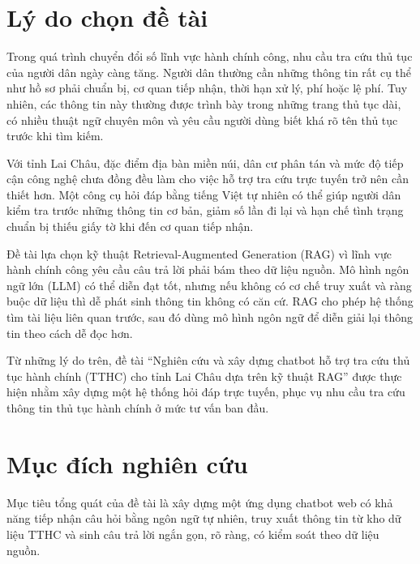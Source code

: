 \section*{Lý do chọn đề
tài}

Trong quá trình chuyển đổi số lĩnh vực hành chính công, nhu cầu tra cứu
thủ tục của người dân ngày càng tăng. Người dân thường cần những thông
tin rất cụ thể như hồ sơ phải chuẩn bị, cơ quan tiếp nhận, thời hạn xử
lý, phí hoặc lệ phí. Tuy nhiên, các thông tin này thường được trình bày
trong những trang thủ tục dài, có nhiều thuật ngữ chuyên môn và yêu cầu
người dùng biết khá rõ tên thủ tục trước khi tìm kiếm.

Với tỉnh Lai Châu, đặc điểm địa bàn miền núi, dân cư phân tán và mức độ
tiếp cận công nghệ chưa đồng đều làm cho việc hỗ trợ tra cứu trực tuyến
trở nên cần thiết hơn. Một công cụ hỏi đáp bằng tiếng Việt tự nhiên có
thể giúp người dân kiểm tra trước những thông tin cơ bản, giảm số lần đi
lại và hạn chế tình trạng chuẩn bị thiếu giấy tờ khi đến cơ quan tiếp
nhận.

Đề tài lựa chọn kỹ thuật Retrieval-Augmented Generation (RAG) vì lĩnh
vực hành chính công yêu cầu câu trả lời phải bám theo dữ liệu nguồn. Mô
hình ngôn ngữ lớn (LLM) có thể diễn đạt tốt, nhưng nếu không có cơ chế
truy xuất và ràng buộc dữ liệu thì dễ phát sinh thông tin không có căn
cứ. RAG cho phép hệ thống tìm tài liệu liên quan trước, sau đó dùng mô
hình ngôn ngữ để diễn giải lại thông tin theo cách dễ đọc hơn.

Từ những lý do trên, đề tài ``Nghiên cứu và xây dựng chatbot hỗ trợ tra
cứu thủ tục hành chính (TTHC) cho tỉnh Lai Châu dựa trên kỹ thuật RAG''
được thực hiện nhằm xây dựng một hệ thống hỏi đáp trực tuyến, phục vụ
nhu cầu tra cứu thông tin thủ tục hành chính ở mức tư vấn ban đầu.

\section*{Mục đích nghiên
cứu}

Mục tiêu tổng quát của đề tài là xây dựng một ứng dụng chatbot web có
khả năng tiếp nhận câu hỏi bằng ngôn ngữ tự nhiên, truy xuất thông tin
từ kho dữ liệu TTHC và sinh câu trả lời ngắn gọn, rõ ràng, có kiểm soát
theo dữ liệu nguồn.

